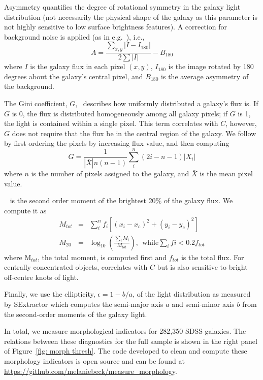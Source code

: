 Asymmetry quantifies the degree of rotational symmetry in the galaxy light distribution
 (not necessarily the physical shape of the galaxy as this parameter is not highly sensitive 
to low surface brightness features). A correction for background noise is applied (as in e.g.~\cite{Conselice2000}), i.e., 
\begin{equation}
A = \frac{\sum_{x,y} |I - I_{180}|}{ 2\sum|I|} - B_{180}
\end{equation}
where $I$ is the galaxy flux in each pixel $(x, y)$, $I_{180}$ is the image rotated by 180 degrees about the galaxy's central pixel, and $B_{180}$ is the average asymmetry of the background. 

The Gini coefficient, $G$,~\citep{Glasser1962, Abraham2003} describes how uniformly distributed a galaxy's flux is.  If $G$ is 0, the flux is distributed homogeneously among all galaxy pixels; if $G$ is 1,  the light is contained within a single pixel. This term correlates with $C$, however, $G$ does not require that the flux be in the central region of the galaxy.  We follow~\cite{Lotz2004} by first ordering the pixels by increasing flux value, and then computing
\begin{equation}
G = \frac{1}{|\bar X|n(n-1)}\sum_i^n(2i-n-1)|X_i|
\end{equation}
where $n$ is the number of pixels assigned to the galaxy, and $\bar X$ is the mean pixel value. 

~\citep{Lotz2004} is the second order moment of the brightest 20\% of the galaxy flux. We compute it as
\begin{eqnarray}
 M_{tot} & = & \sum_i^nf_i[(x_i-x_c)^2 + (y_i-y_c)^2]  \\
 M_{20} & = & \log_{10} (\frac{\sum_iM_i}{M_{tot}}), ~~\textrm{while} \sum_ifi < 0.2f_{tot}
\end{eqnarray}
where M$_{tot}$, the total moment, is computed first and $f_{tot}$ is the total flux. For centrally concentrated objects,  correlates with $C$ but is also sensitive to bright off-centre knots of light. 

Finally, we use the ellipticity, $\epsilon = 1 - b/a$, of the light distribution as measured by SExtractor which computes the semi-major axis $a$ and semi-minor axis $b$ from the second-order moments of the galaxy light.  

In total, we measure morphological indicators for 282,350 SDSS galaxies. The relations between these diagnostics for the full sample is shown in the right panel of Figure~\ref{fig: morph thresh}. The code developed to clean and compute these morphology indicators is open source and can be found at \url{https://github.com/melaniebeck/measure_morphology}.



